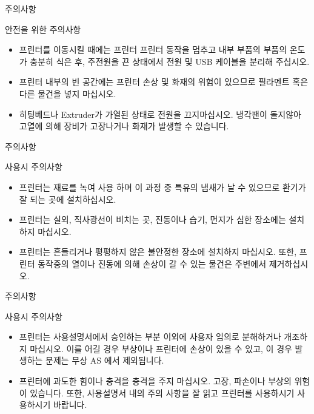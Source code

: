 \begin{frame}{주의사항}
\begin{block}{안전을 위한 주의사항}
\begin{itemize}
\item 프린터를 이동시킬 때에는 프린터 프린터 동작을 멈추고 내부 부품의 부품의 온도가 충분히 식은 후, 주전원을 끈 상태에서 전원 및 USB 케이블을 분리해 주십시오.
\item 프린터 내부의 빈 공간에는 프린터 손상 및 화재의 위험이 있으므로 필라멘트 혹은 다른 물건을 넣지 마십시오.
\item 히팅베드나 Extruder가 가열된 상태로 전원을 끄지마십시오. 냉각팬이 돌지않아 고열에 의해 장비가 고장나거나 화재가 발생할 수 있습니다.
\end{itemize}
\end{block}
\end{frame}


\begin{frame}{주의사항}
\begin{block}{사용시 주의사항}
\begin{itemize}
\item 프린터는 재료를 녹여 사용 하며 이 과정 중 특유의 냄새가 날 수 있으므로 환기가 잘 되는 곳에 설치하십시오.
\item 프린터는 실외, 직사광선이 비치는 곳, 진동이나 습기, 먼지가 심한 장소에는 설치하지 마십시오.
\item 프린터는 흔들리거나 평평하지 않은 불안정한 장소에 설치하지 마십시오. 또한, 프린터 동작중의 열이나 진동에 의해 손상이 갈 수 있는 물건은 주변에서 제거하십시오.
\end{itemize}
\end{block}
\end{frame}

\begin{frame}{주의사항}
\begin{block}{사용시 주의사항}
\begin{itemize}
\item 프린터는 사용설명서에서 승인하는 부분 이외에 사용자 임의로 분해하거나 개조하지 마십시오. 이를 어길 경우 부상이나 프린터에 손상이 있을 수 있고, 이 경우 발생하는 문제는 무상 AS 에서 제외됩니다.
\item 프린터에 과도한 힘이나 충격을 충격을 주지 마십시오. 고장, 파손이나 부상의 위험이 있습니다. 또한, 사용설명서 내의 주의 사항을 잘 읽고 프린터를 사용하시기 사용하시기 바랍니다.
\end{itemize}
\end{block}
\end{frame}
